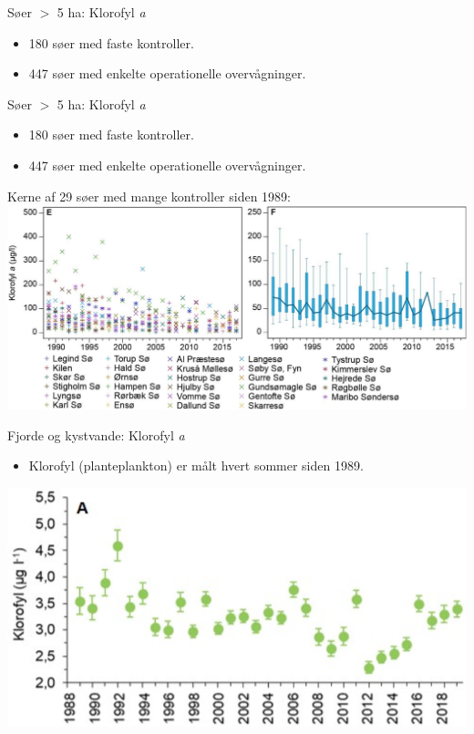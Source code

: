 \begin{frame}{Søer $>$ 5 ha: Klorofyl \textit{a}}
  \begin{itemize}
    \item 180 søer med faste kontroller.
    \item 447 søer med enkelte operationelle overvågninger.
  \end{itemize}
  \vfill
\end{frame}
\begin{frame}{Søer $>$ 5 ha: Klorofyl \textit{a}}
  \begin{itemize}
    \item 180 søer med faste kontroller.
    \item 447 søer med enkelte operationelle overvågninger.
  \end{itemize}
  Kerne af 29 søer med mange kontroller siden 1989:
  \includegraphics[width=\textwidth]{figures/chlorophyll_lakes}
\end{frame}

\begin{frame}{Fjorde og kystvande: Klorofyl \textit{a}}
  \begin{itemize}
    \item Klorofyl (planteplankton) er målt hvert sommer siden 1989.
  \end{itemize}
  \includegraphics[width=\textwidth]{figures/chlorophyll_fjords_coastal}
\end{frame}

